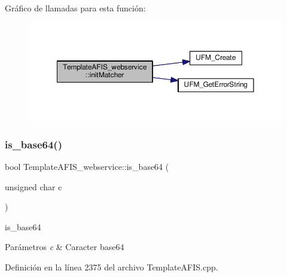Gráfico de llamadas para esta función\+:\nopagebreak
\begin{figure}[H]
\begin{center}
\leavevmode
\includegraphics[width=350pt]{classTemplateAFIS__webservice_a8698c0f638f3be26a0664edd56038847_cgraph}
\end{center}
\end{figure}
\hypertarget{classTemplateAFIS__webservice_a1fb45563a560d59202d2d051fa649798}{}\label{classTemplateAFIS__webservice_a1fb45563a560d59202d2d051fa649798} 
\subsubsection{\texorpdfstring{is\+\_\+base64()}{is\_base64()}}
{\footnotesize\ttfamily bool Template\+A\+F\+I\+S\+\_\+webservice\+::is\+\_\+base64 (\begin{DoxyParamCaption}\item[{unsigned char}]{c }\end{DoxyParamCaption})}



is\+\_\+base64 


\begin{DoxyParams}{Parámetros}
{\em c} & Caracter base64 \\
\hline
\end{DoxyParams}


Definición en la línea 2375 del archivo Template\+A\+F\+I\+S.\+cpp.

\hypertarget{classTemplateAFIS__webservice_a432d8a18012883bacddf5f9db4b58b69}{}\label{classTemplateAFIS__webservice_a432d8a18012883bacddf5f9db4b58b69} 
